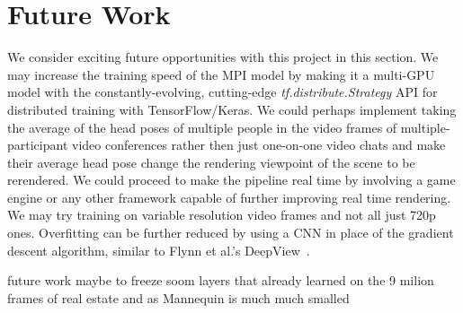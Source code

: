 \section{Future Work}\label{sec:future-work}

We consider exciting future opportunities with this project in this section. We may increase the training speed of the MPI model by making it a multi-GPU model with the constantly-evolving, cutting-edge \textit{tf.distribute.Strategy} API for distributed training with TensorFlow/Keras. We could perhaps implement taking the average of the head poses of multiple people in the video frames of multiple-participant video conferences rather then just one-on-one video chats and make their average head pose change the rendering viewpoint of the scene to be rerendered. We could proceed to make the pipeline real time by involving a game engine or any other framework capable of further improving real time rendering. We may try training on variable resolution video frames and not all just 720p ones. Overfitting can be further reduced by using a CNN in place of the gradient descent algorithm, similar to Flynn et al.'s DeepView~\cite{flynn_deepview_2019}.

future work maybe to freeze soom layers that already learned on the 
9 milion frames of real estate and as Mannequin is much much smalled 










